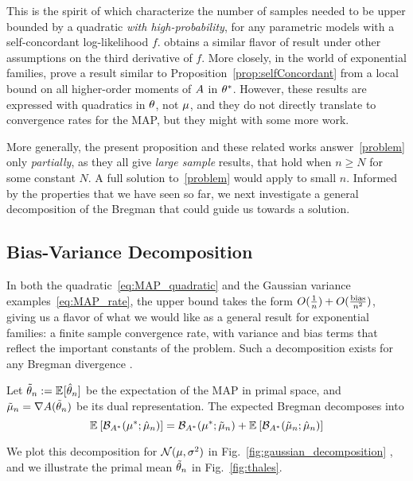This is the spirit of
\citet{ostrovskii2021finite}  which characterize the number of samples needed to be upper bounded by a quadratic \emph{with high-probability}, for any parametric models with a self-concordant log-likelihood $f$.
\citet{anastasiou2017bounds} obtains a similar flavor of result under other assumptions on the third derivative of $f$.
More closely, in the world of exponential families, \citet{kakade2010learning} prove a result similar to Proposition~\ref{prop:selfConcordant} from a local bound on all higher-order moments of $A$ in $\theta^*$.
However, these results are expressed with quadratics in $\theta$, not $\mu$, and they do not directly translate to convergence rates for the MAP, but they might with some more work.

More generally, the present proposition and these related works answer~\eqref{problem} only \emph{partially}, as they all give \textit{large sample} results, that hold when $n\geq N$ for some constant $N$. 
A full solution to~\eqref{problem} would apply to small $n$.
Informed by the properties that we have seen so far, we next investigate a general decomposition of the Bregman that could guide us towards a solution.


\subsection{Bias-Variance Decomposition}
\label{ssec:bias-variance}
In both the quadratic~\eqref{eq:MAP_quadratic} and the Gaussian variance examples~\eqref{eq:MAP_rate}, the upper bound takes the form $O(\frac{1}{n}) + O(\frac{\text{bias}}{n^2})$,
giving us a flavor of what we would like as a general result for exponential families: a finite sample convergence rate, with variance and bias terms that reflect the important constants of the problem.
Such a decomposition exists for any Bregman divergence \citep[Theorem 0.1]{pfau2013generalized}.
\begin{theorem}
	Let $\tilde \theta_n := \mathbb{E}_{} [ \hat \theta_n ] $ be the expectation of the MAP in primal space, and $\tilde {\mu}_n = \nabla A(\tilde \theta_n )$ be its dual representation. The  expected Bregman decomposes into
\begin{equation}
	\mathbb{E}_{} \left[ {\mathcal B}_{A^*}(\mu^* ; \hat {\mu}_n) \right]  = {{\mathcal B}_{A^*}(\mu^* ; \tilde {\mu}_n)}
	+ {\mathbb{E}_{} \left[ {\mathcal B}_{A^*}(\tilde {\mu}_n ; \hat {\mu}_n) \right] }
	\label{eq:bias-variance}
\end{equation}
\end{theorem}
We plot this decomposition for ${\mathcal N}(\mu, \sigma^2)$ in Fig.~\ref{fig:gaussian_decomposition} , and we illustrate the primal mean $\tilde {\theta}_n$ in  Fig.~\ref{fig:thales}.

